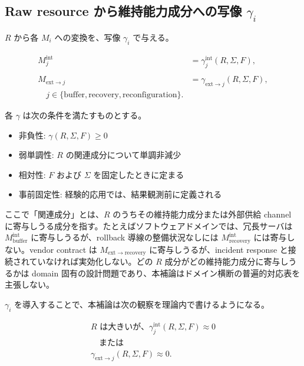 \documentclass[12pt,a4paper]{article}
\begin{document}
\subsection{\texorpdfstring{Raw resource から維持能力成分への写像 \(\gamma_i\)}{Raw resource から維持能力成分への写像 \textbackslash gamma\_i}}\label{raw-resource-ux304bux3089ux7dadux6301ux80fdux529bux6210ux5206ux3078ux306eux5199ux50cf-gamma_i}

\(R\) から各 \(M_i\) への変換を、写像 \(\gamma_i\) で与える。

\begin{definition}[維持能力成分への変換写像]

$$
\begin{aligned}
M_{j}^{\mathrm{int}} &= \gamma_{j}^{\mathrm{int}}(R, \Sigma, F), \\
\quad \\
M_{\mathrm{ext}\to j} &= \gamma_{\mathrm{ext}\to j}(R, \Sigma, F), \\
\quad j \in \{\mathrm{buffer},\mathrm{recovery},\mathrm{reconfiguration}\}.
\end{aligned}
$$

各 $\gamma$ は次の条件を満たすものとする。
\begin{itemize}
\item 非負性: $\gamma(R, \Sigma, F) \ge 0$
\item 弱単調性: $R$ の関連成分について単調非減少
\item 相対性: $F$ および $\Sigma$ を固定したときに定まる
\item 事前固定性: 経験的応用では、結果観測前に定義される

\end{itemize}
\end{definition}

ここで「関連成分」とは、\(R\) のうちその維持能力成分または外部供給 channel に寄与しうる成分を指す。たとえばソフトウェアドメインでは、冗長サーバは \(M_{\mathrm{buffer}}^{\mathrm{int}}\) に寄与しうるが、rollback 導線の整備状況なしには \(M_{\mathrm{recovery}}^{\mathrm{int}}\) には寄与しない。vendor contract は \(M_{\mathrm{ext}\to\mathrm{recovery}}\) に寄与しうるが、incident response と接続されていなければ実効化しない。どの \(R\) 成分がどの維持能力成分に寄与しうるかは domain 固有の設計問題であり、本補論はドメイン横断の普遍的対応表を主張しない。

\(\gamma_i\) を導入することで、本補論は次の観察を理論内で書けるようになる。

\[
\begin{aligned}
R \text{ は大きいが、} \gamma_{j}^{\mathrm{int}}(R, \Sigma, F) \approx 0 \\
\quad \text{または} \quad \\
\gamma_{\mathrm{ext}\to j}(R, \Sigma, F) \approx 0.
\end{aligned}
\]
\end{document}
